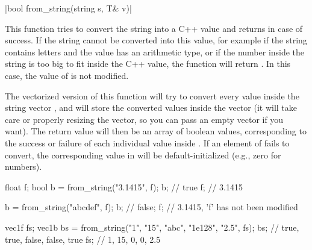 \item \vectorfunc \cppinline|bool from_string(string s, T& v)| 

This function tries to convert the string  into a C++ value  and returns \cpptrue in case of success. If the string cannot be converted into this value, for example if the string contains letters and the value has an arithmetic type, or if the number inside the string is too big to fit inside the C++ value, the function will return \cppfalse. In this case, the value of  is not modified.

The vectorized version of this function will try to convert every value inside the string vector , and will store the converted values inside the vector  (it will take care or properly resizing the vector, so you can pass an empty vector if you want). The return value will then be an array of boolean values, corresponding to the success or failure of each individual value inside . If an element of  fails to convert, the corresponding value in  will be default-initialized (e.g., zero for numbers).

\begin{example}
\begin{cppcode}
float f;
bool b = from_string("3.1415", f);
b; // true
f; // 3.1415

b = from_string("abcdef", f);
b; // false;
f; // 3.1415, 'f' has not been modified

vec1f fs;
vec1b bs = from_string({"1", "15", "abc", "1e128", "2.5"}, fs);
bs; // {true, true, false, false, true}
fs; // {1,    15,   0,     0,     2.5}
\end{cppcode}
\end{example}

